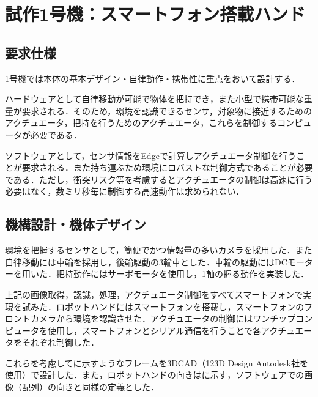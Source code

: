 \chapter{試作1号機：スマートフォン搭載ハンド}
\newpage

\section{要求仕様}

1号機では本体の基本デザイン・自律動作・携帯性に重点をおいて設計する．

ハードウェアとして自律移動が可能で物体を把持でき，また小型で携帯可能な重量が要求される．そのため，環境を認識できるセンサ，対象物に接近するためのアクチュエータ，把持を行うためのアクチュエータ，これらを制御するコンピュータが必要である．

ソフトウェアとして，センサ情報をEdgeで計算しアクチュエータ制御を行うことが要求される．また持ち運ぶため環境にロバストな制御方式であることが必要である．ただし，衝突リスク等を考慮するとアクチュエータの制御は高速に行う必要はなく，数ミリ秒毎に制御する高速動作は求められない．


\section{機構設計・機体デザイン}
環境を把握するセンサとして，簡便でかつ情報量の多いカメラを採用した．また自律移動には車輪を採用し，後輪駆動の3輪車とした．車輪の駆動にはDCモーターを用いた．把持動作にはサーボモータを使用し，1軸の握る動作を実装した．

上記の画像取得，認識，処理，アクチュエータ制御をすべてスマートフォンで実現を試みた．ロボットハンドにはスマートフォンを搭載し，スマートフォンのフロントカメラから環境を認識させた．アクチュエータの制御にはワンチップコンピュータを使用し，スマートフォンとシリアル通信を行うことで各アクチュエータをそれぞれ制御した．

これらを考慮してに示すようなフレームを3DCAD（123D Design Autodesk社を使用）で設計した．また，ロボットハンドの向きはに示す，ソフトウェアでの画像（配列）の向きと同様の定義とした．

